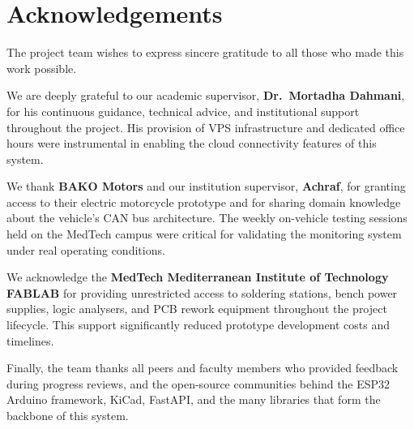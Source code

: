 %



\section*{Acknowledgements}



\vspace{1.4cm}
\noindent

The project team wishes to express sincere gratitude to all those who made this work possible.

We are deeply grateful to our academic supervisor, \textbf{Dr.\ Mortadha Dahmani}, for his continuous guidance, technical advice, and institutional support throughout the project. His provision of VPS infrastructure and dedicated office hours were instrumental in enabling the cloud connectivity features of this system.

We thank \textbf{BAKO Motors} and our institution supervisor, \textbf{Achraf}, for granting access to their electric motorcycle prototype and for sharing domain knowledge about the vehicle's CAN bus architecture. The weekly on-vehicle testing sessions held on the MedTech campus were critical for validating the monitoring system under real operating conditions.

We acknowledge the \textbf{MedTech Mediterranean Institute of Technology FABLAB} for providing unrestricted access to soldering stations, bench power supplies, logic analysers, and PCB rework equipment throughout the project lifecycle. This support significantly reduced prototype development costs and timelines.

Finally, the team thanks all peers and faculty members who provided feedback during progress reviews, and the open-source communities behind the ESP32 Arduino framework, KiCad, FastAPI, and the many libraries that form the backbone of this system.

